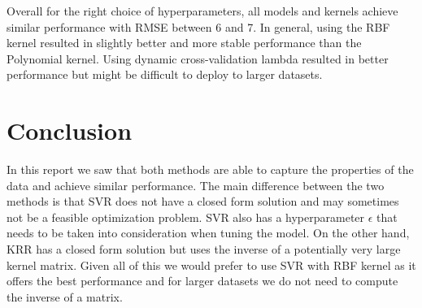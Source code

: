 \documentclass[9pt]{IEEEtran}
\begin{document}
Overall for the right choice of hyperparameters, all models and kernels achieve similar performance with RMSE between 6 and 7.
In general, using the RBF kernel resulted in slightly better and more stable performance than the Polynomial kernel.
Using dynamic cross-validation lambda resulted in better performance but might be difficult to deploy to larger datasets.



\section{Conclusion}

In this report we saw that both methods are able to capture the properties of the data and achieve similar performance.
The main difference between the two methods is that SVR does not have a closed form solution and may sometimes not be a feasible optimization problem.
SVR also has a hyperparameter $\epsilon$ that needs to be taken into consideration when tuning the model.
On the other hand, KRR has a closed form solution but uses the inverse of a potentially very large kernel matrix.
Given all of this we would prefer to use SVR with RBF kernel as it offers the best performance and for larger datasets we do not need to compute the inverse of a matrix.





\end{document}
